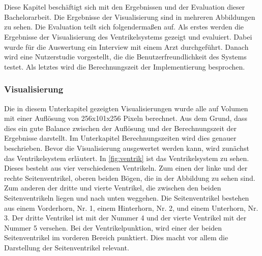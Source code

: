 \chapter{}
\label{sec:results}





Diese Kapitel beschäftigt sich mit den Ergebnissen und der Evaluation dieser Bachelorarbeit. Die Ergebnisse der Visualisierung sind in mehreren Abbildungen zu sehen. Die Evaluation teilt sich folgendermaßen auf. Als erstes werden die Ergebnisse der Visualisierung des Ventrikelsystems gezeigt und evaluiert. Dabei wurde für die Auswertung ein Interview mit einem Arzt durchgeführt. Danach wird eine Nutzerstudie vorgestellt, die die Benutzerfreundlichkeit des Systems testet. Als letztes wird die Berechnungszeit der Implementierung besprochen.


\subsection{Visualisierung}

Die in diesem Unterkapitel gezeigten Visualisierungen wurde alle auf Volumen mit einer Auflösung von 256x101x256 Pixeln berechnet. Aus dem Grund, dass dies ein gute Balance zwischen der Auflösung und der Berechnungszeit der Ergebnisse darstellt. Im Unterkapitel  Berechnungszeiten wird dies genauer beschrieben. Bevor die Visualisierung ausgewertet werden kann, wird zunächst das Ventrikelsystem erläutert.
\newline
In \autoref{fig:ventrik} ist das Ventrikelsystem zu sehen. Dieses besteht aus vier verschiedenen Ventrikeln. Zum einen der linke und der rechte Seitenventrikel, oberen beiden Bögen, die in der Abbildung zu sehen sind. Zum anderen der dritte und vierte Ventrikel, die zwischen den beiden Seitenventrikeln liegen und nach unten weggehen. Die Seitenventrikel bestehen aus einem Vorderhorn, Nr. 1,  einem Hinterhorn, Nr. 2, und einem Unterhorn, Nr. 3. Der dritte Ventrikel ist mit der Nummer 4 und der vierte Ventrikel mit der Nummer 5 versehen.
\newline
Bei der Ventrikelpunktion, wird einer der beiden Seitenventrikel im vorderen Bereich punktiert. Dies macht vor allem die Darstellung der Seitenventrikel relevant.

